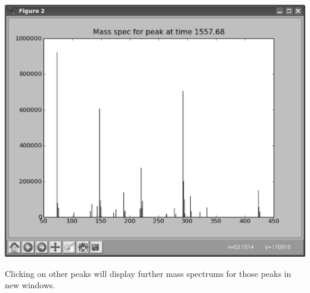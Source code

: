 \begin{center}
\includegraphics[scale=0.33]{graphics/test-71-spec.eps}
\end{center}

Clicking on other peaks will display further mass spectrums for those peaks in new windows.
